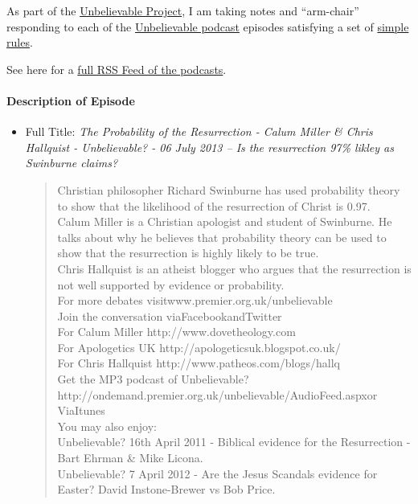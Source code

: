\documentclass{tufte-book}
\begin{document}
As part of the
\href{http://brianblais.wordpress.com/2013/02/27/unbelievable-project-a-non-believers-armchair-perspective-on-six-years-of-christian-debates/}{Unbelievable
Project}, I am taking notes and ``arm-chair'' responding to each of the
\href{http://www.premierradio.org.uk/shows/saturday/unbelievable.aspx}{Unbelievable
podcast} episodes satisfying a set of
\href{http://brianblais.wordpress.com/2013/02/27/unbelievable-project-a-non-believers-armchair-perspective-on-six-years-of-christian-debates/}{simple
rules}.

See here for a
\href{http://ondemand.premier.org.uk/unbelievable/AudioFeed.aspx}{full
RSS Feed of the podcasts}.

\paragraph{Description of Episode}\label{descriptionofepisode}

\begin{itemize}
\item
  Full Title: \emph{The Probability of the Resurrection - Calum Miller
  \& Chris Hallquist - Unbelievable? - 06 July 2013 -- Is the
  resurrection 97\% likley as Swinburne claims?}

  \begin{quote}
  Christian philosopher Richard Swinburne has used probability theory to
  show that the likelihood of the resurrection of Christ is 0.97.\\
  Calum Miller is a Christian apologist and student of Swinburne. He
  talks about why he believes that probability theory can be used to
  show that the resurrection is highly likely to be true.\\ Chris
  Hallquist is an atheist blogger who argues that the resurrection is
  not well supported by evidence or probability.\\ For more debates
  visitwww.premier.org.uk/unbelievable\\ Join the conversation
  viaFacebookandTwitter\\ For Calum Miller http://www.dovetheology.com\\
  For Apologetics UK http://apologeticsuk.blogspot.co.uk/\\ For Chris
  Hallquist http://www.patheos.com/blogs/hallq\\ Get the MP3 podcast of
  Unbelievable?http://ondemand.premier.org.uk/unbelievable/AudioFeed.aspxor
  ViaItunes\\ You may also enjoy:\\ Unbelievable? 16th April 2011 -
  Biblical evidence for the Resurrection - Bart Ehrman \& Mike Licona.\\
  Unbelievable? 7 April 2012 - Are the Jesus Scandals evidence for
  Easter? David Instone-Brewer vs Bob Price.
  \end{quote}
\end{itemize}
\end{document}
